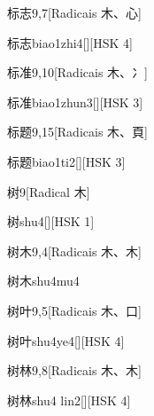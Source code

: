 \begin{entry}{标志}{9,7}[Radicais ⽊、⼼]
  \begin{phonetics}{标志}{biao1zhi4}[][HSK 4]
  \end{phonetics}
\end{entry}

\begin{entry}{标准}{9,10}[Radicais ⽊、⼎]
  \begin{phonetics}{标准}{biao1zhun3}[][HSK 3]
  \end{phonetics}
\end{entry}

\begin{entry}{标题}{9,15}[Radicais ⽊、⾴]
  \begin{phonetics}{标题}{biao1ti2}[][HSK 3]
  \end{phonetics}
\end{entry}

\begin{entry}{树}{9}[Radical ⽊]
  \begin{phonetics}{树}{shu4}[][HSK 1]
  \end{phonetics}
\end{entry}

\begin{entry}{树木}{9,4}[Radicais ⽊、⽊]
  \begin{phonetics}{树木}{shu4mu4}
  \end{phonetics}
\end{entry}

\begin{entry}{树叶}{9,5}[Radicais ⽊、⼝]
  \begin{phonetics}{树叶}{shu4ye4}[][HSK 4]
  \end{phonetics}
\end{entry}

\begin{entry}{树林}{9,8}[Radicais ⽊、⽊]
  \begin{phonetics}{树林}{shu4 lin2}[][HSK 4]
  \end{phonetics}
\end{entry}

